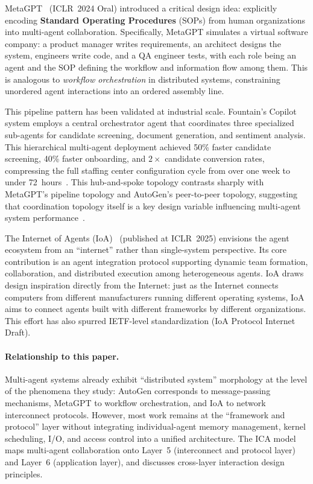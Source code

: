 MetaGPT~\cite{metagpt2023} (ICLR~2024 Oral) introduced a critical design idea: explicitly encoding \textbf{Standard Operating Procedures} (SOPs) from human organizations into multi-agent collaboration.
Specifically, MetaGPT simulates a virtual software company: a product manager writes requirements, an architect designs the system, engineers write code, and a QA engineer tests, with each role being an agent and the SOP defining the workflow and information flow among them.
This is analogous to \textit{workflow orchestration} in distributed systems, constraining unordered agent interactions into an ordered assembly line.

This pipeline pattern has been validated at industrial scale.
Fountain's Copilot system employs a central orchestrator agent that coordinates three specialized sub-agents for candidate screening, document generation, and sentiment analysis.
This hierarchical multi-agent deployment achieved 50\% faster candidate screening, 40\% faster onboarding, and $2\times$ candidate conversion rates, compressing the full staffing center configuration cycle from over one week to under 72~hours~\cite{anthropic2026agenticreport}.
This hub-and-spoke topology contrasts sharply with MetaGPT's pipeline topology and AutoGen's peer-to-peer topology, suggesting that coordination topology itself is a key design variable influencing multi-agent system performance~\cite{wu2023autogen,metagpt2023}.

The Internet of Agents (IoA)~\cite{ioa2024} (published at ICLR~2025) envisions the agent ecosystem from an ``internet'' rather than single-system perspective.
Its core contribution is an agent integration protocol supporting dynamic team formation, collaboration, and distributed execution among heterogeneous agents.
IoA draws design inspiration directly from the Internet: just as the Internet connects computers from different manufacturers running different operating systems, IoA aims to connect agents built with different frameworks by different organizations.
This effort has also spurred IETF-level standardization (IoA Protocol Internet Draft).

\paragraph{Relationship to this paper.}
Multi-agent systems already exhibit ``distributed system'' morphology at the level of the phenomena they study: AutoGen corresponds to message-passing mechanisms, MetaGPT to workflow orchestration, and IoA to network interconnect protocols.
However, most work remains at the ``framework and protocol'' layer without integrating individual-agent memory management, kernel scheduling, I/O, and access control into a unified architecture.
The ICA model maps multi-agent collaboration onto Layer~5 (interconnect and protocol layer) and Layer~6 (application layer), and discusses cross-layer interaction design principles.

